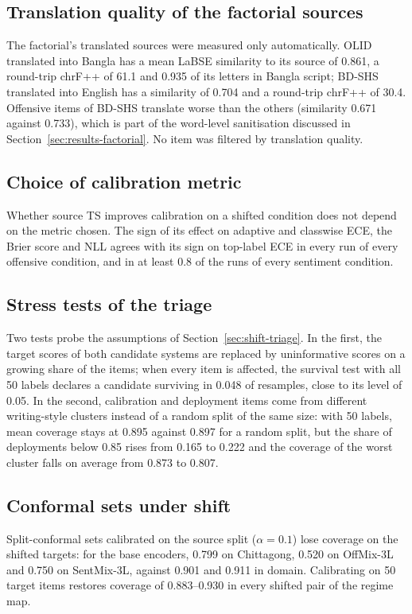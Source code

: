 \subsection{Translation quality of the factorial sources}
\label{sec:appendix-translation}
The factorial's translated sources were measured only automatically. OLID translated into Bangla has a mean LaBSE
similarity to its source of 0.861, a round-trip chrF++ of 61.1 and 0.935 of its letters in Bangla script; BD-SHS
translated into English has a similarity of 0.704 and a round-trip chrF++ of 30.4. Offensive items of BD-SHS translate
worse than the others (similarity 0.671 against 0.733), which is part of the word-level sanitisation discussed in
Section~\ref{sec:results-factorial}. No item was filtered by translation quality.

\subsection{Choice of calibration metric}
Whether source TS improves calibration on a shifted condition does not depend on the metric chosen. The sign of its
effect on adaptive and classwise ECE, the Brier score and NLL agrees with its sign on top-label ECE in every run of
every offensive condition, and in at least 0.8 of the runs of every sentiment condition.

\subsection{Stress tests of the triage}
\label{sec:appendix-stress}
Two tests probe the assumptions of Section~\ref{sec:shift-triage}. In the first, the target scores of both candidate
systems are replaced by uninformative scores on a growing share of the items; when every item is affected, the
survival test with all 50 labels declares a candidate surviving in 0.048 of resamples, close to its level of 0.05. In
the second, calibration and deployment items come from different writing-style clusters instead of a random split of
the same size: with 50 labels, mean coverage stays at 0.895 against 0.897 for a random split, but the share of
deployments below 0.85 rises from 0.165 to 0.222 and the coverage of the worst cluster falls on average from 0.873 to 0.807.

\subsection{Conformal sets under shift}
Split-conformal sets calibrated on the source split ($\alpha = 0.1$) lose coverage on the shifted targets: for the base
encoders, 0.799 on Chittagong, 0.520 on OffMix-3L and 0.750 on SentMix-3L, against 0.901 and 0.911 in domain. Calibrating
on 50 target items restores coverage of 0.883--0.930 in every shifted pair of the regime map.

